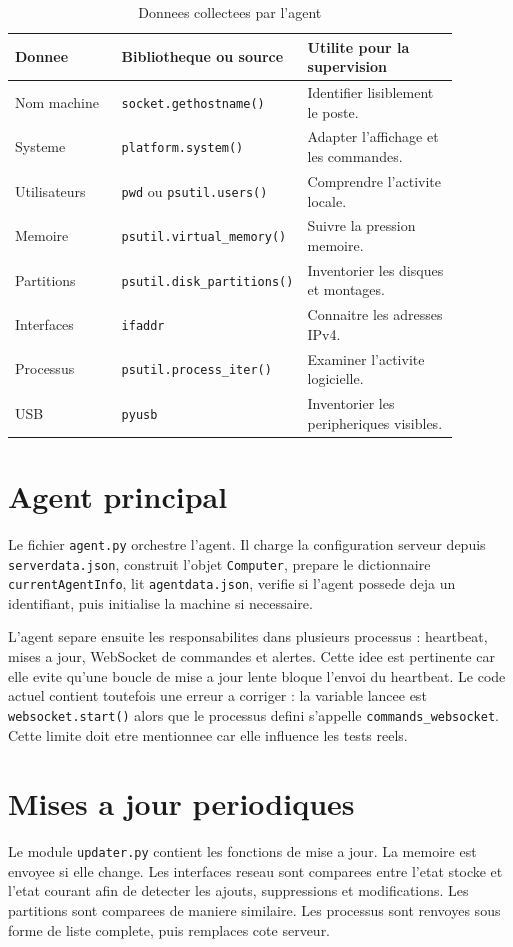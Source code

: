 \documentclass[12pt,a4paper]{report}
\begin{document}
\begin{longtable}{p{0.24\linewidth}p{0.30\linewidth}p{0.34\linewidth}}
\caption{Donnees collectees par l'agent}\\
\toprule
\textbf{Donnee} & \textbf{Bibliotheque ou source} & \textbf{Utilite pour la supervision}\\
\midrule
Nom machine & \texttt{socket.gethostname()} & Identifier lisiblement le poste.\\
Systeme & \texttt{platform.system()} & Adapter l'affichage et les commandes.\\
Utilisateurs & \texttt{pwd} ou \texttt{psutil.users()} & Comprendre l'activite locale.\\
Memoire & \texttt{psutil.virtual\_memory()} & Suivre la pression memoire.\\
Partitions & \texttt{psutil.disk\_partitions()} & Inventorier les disques et montages.\\
Interfaces & \texttt{ifaddr} & Connaitre les adresses IPv4.\\
Processus & \texttt{psutil.process\_iter()} & Examiner l'activite logicielle.\\
USB & \texttt{pyusb} & Inventorier les peripheriques visibles.\\
\bottomrule
\end{longtable}

\section{Agent principal}
Le fichier \texttt{agent.py} orchestre l'agent. Il charge la configuration serveur depuis \texttt{serverdata.json}, construit l'objet \texttt{Computer}, prepare le dictionnaire \texttt{currentAgentInfo}, lit \texttt{agentdata.json}, verifie si l'agent possede deja un identifiant, puis initialise la machine si necessaire.

L'agent separe ensuite les responsabilites dans plusieurs processus : heartbeat, mises a jour, WebSocket de commandes et alertes. Cette idee est pertinente car elle evite qu'une boucle de mise a jour lente bloque l'envoi du heartbeat. Le code actuel contient toutefois une erreur a corriger : la variable lancee est \texttt{websocket.start()} alors que le processus defini s'appelle \texttt{commands\_websocket}. Cette limite doit etre mentionnee car elle influence les tests reels.

\section{Mises a jour periodiques}
Le module \texttt{updater.py} contient les fonctions de mise a jour. La memoire est envoyee si elle change. Les interfaces reseau sont comparees entre l'etat stocke et l'etat courant afin de detecter les ajouts, suppressions et modifications. Les partitions sont comparees de maniere similaire. Les processus sont renvoyes sous forme de liste complete, puis remplaces cote serveur.
\end{document}
